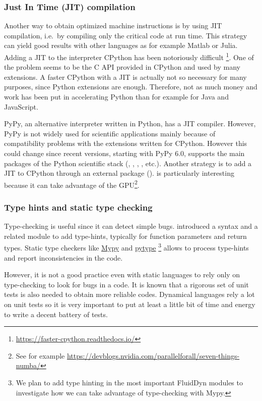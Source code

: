 \subsubsection{Just In Time (JIT) compilation}
Another way to obtain optimized machine instructions is by using JIT
compilation, i.e.\ by compiling only the critical code at run time.
%
This strategy can yield good results with other languages as for example Matlab
or Julia.
%
Adding a JIT to the interpreter CPython has been notoriously difficult
\footnote{\url{https://faster-cpython.readthedocs.io/}}. One of the
problem seems to be the C API provided in CPython and used by many extensions.
%
A faster CPython with a JIT is actually not so necessary for many purposes,
since Python extensions are enough. Therefore, not as much money and work
has been put in accelerating Python than for example for Java and JavaScript.

PyPy, an alternative interpreter written in Python, has a JIT compiler. However,
PyPy is not widely used for scientific applications mainly because of
compatibility problems with the extensions written for CPython.
%
However this could change since recent versions, starting with PyPy 6.0,
supports the main packages of the Python scientific stack (\Numpy, \Scipy,
, , etc.).
%
Another strategy is to add a JIT to CPython through an external package
().
%
 is particularly interesting because it can take advantage of the
GPU\footnote{See for example
\url{https://devblogs.nvidia.com/parallelforall/seven-things-numba/}}.


\subsubsection{Type hints and static type checking}
%
Type-checking is useful since it can detect simple bugs.
introduced a syntax and a related  module to add
type-hints, typically for function parameters and return types.
%
Static type checkers like \href{http://mypy-lang.org/}{Mypy} and
\href{https://github.com/google/pytype}{pytype}%
\footnote{We plan to add type hinting in the most important FluidDyn modules to
investigate how we can take advantage of type-checking with Mypy.}
%
allows to process type-hints and report inconsistencies in the code.

However, it is not a good practice even with static languages to rely only on
type-checking to look for bugs in a code.
%
It is known that a rigorous set of unit tests is also needed to obtain more
reliable codes.
%
Dynamical languages rely a lot on unit tests so it is very important to put at
least a little bit of time and energy to write a decent battery of tests.

